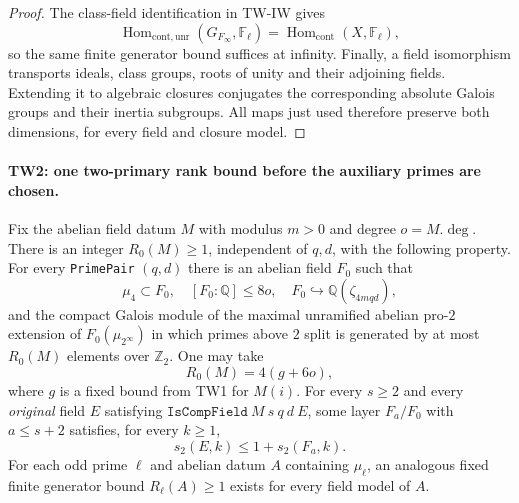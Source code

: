\begin{proof}
The class-field identification in TW-IW gives
\[
 \operatorname{Hom}_{\mathrm{cont,unr}}
 (G_{F_\infty},\mathbb F_\ell)
   =\operatorname{Hom}_{\mathrm{cont}}(X,\mathbb F_\ell),
 \tag{TW.4}
\]
so the same finite generator bound suffices at infinity.
Finally, a field isomorphism transports ideals, class groups, roots
of unity and their adjoining fields.  Extending it to algebraic
closures conjugates the corresponding absolute Galois groups and
their inertia subgroups.  All maps just used therefore preserve
both dimensions, for every field and closure model.
\end{proof}

\paragraph{TW2: one two-primary rank bound before the auxiliary primes are chosen.}
\label{claim:TW2}
Fix the abelian field datum $M$ with modulus $m>0$ and degree
$o=M.\deg$.  There is an integer $R_0(M)\ge1$, independent of
$q,d$, with the following property.  For every \texttt{PrimePair}
$(q,d)$ there is an abelian field $F_0$ such that
\[
 \mu_4\subset F_0,\quad [F_0:\mathbb Q]\le8o,\quad
 F_0\hookrightarrow\mathbb Q(\zeta_{4mqd}),
 \tag{TW.5}
\]
and the compact Galois module of the maximal unramified abelian
pro-$2$ extension of $F_0(\mu_{2^\infty})$ in which primes above
$2$ split is generated by at most $R_0(M)$ elements over
$\mathbb Z_2$.  One may take
\[
                 R_0(M)=4(g+6o),                         \tag{TW.6}
\]
where $g$ is a fixed bound from TW1 for $M(i)$.
For every $s\ge2$ and every \emph{original} field $E$ satisfying
$\texttt{IsCompField}\ M\ s\ q\ d\ E$, some layer $F_a/F_0$ with
$a\le s+2$ satisfies, for every $k\ge1$,
\[
                    s_2(E,k)\le1+s_2(F_a,k).             \tag{TW.7}
\]
For each odd prime $\ell$ and abelian datum $A$ containing
$\mu_\ell$, an analogous fixed finite generator bound
$R_\ell(A)\ge1$ exists for every field model of $A$.

